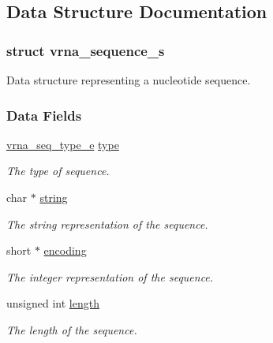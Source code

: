 \subsection{Data Structure Documentation}
\label{structvrna__sequence__s}
\subsubsection{struct vrna\+\_\+sequence\+\_\+s}
Data structure representing a nucleotide sequence. \subsubsection*{Data Fields}
\begin{DoxyCompactItemize}
\item 
\mbox{\label{group__alphabet__utils_aee11f4cc6f792cd36afab3bf7a30ca7b}} 
\hyperlink{group__alphabet__utils_ga85cda3fcf5d6bd7ec090d3a96e808609}{vrna\+\_\+seq\+\_\+type\+\_\+e} \hyperlink{group__alphabet__utils_aee11f4cc6f792cd36afab3bf7a30ca7b}{type}
\begin{DoxyCompactList}\small\item\em The type of sequence. \end{DoxyCompactList}\item 
\mbox{\label{group__alphabet__utils_aa885a2c52b3f87fb6c8f51a77a3430a7}} 
char $\ast$ \hyperlink{group__alphabet__utils_aa885a2c52b3f87fb6c8f51a77a3430a7}{string}
\begin{DoxyCompactList}\small\item\em The string representation of the sequence. \end{DoxyCompactList}\item 
\mbox{\label{group__alphabet__utils_a8010ad82da6766e859e6f25e275a1d89}} 
short $\ast$ \hyperlink{group__alphabet__utils_a8010ad82da6766e859e6f25e275a1d89}{encoding}
\begin{DoxyCompactList}\small\item\em The integer representation of the sequence. \end{DoxyCompactList}\item 
\mbox{\label{group__alphabet__utils_af60876d93312ce0b842574a14c3a9cdd}} 
unsigned int \hyperlink{group__alphabet__utils_af60876d93312ce0b842574a14c3a9cdd}{length}
\begin{DoxyCompactList}\small\item\em The length of the sequence. \end{DoxyCompactList}\end{DoxyCompactItemize}


